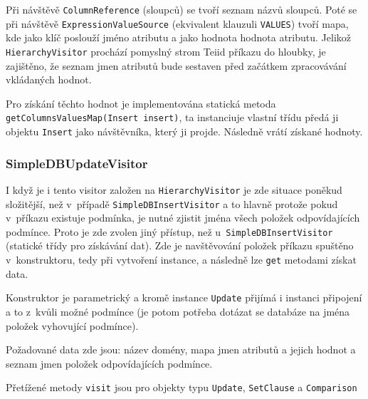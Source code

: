\documentclass[oneside,12pt]{fithesis2}
\begin{document}
Při návštěvě \texttt{ColumnReference} (sloupců) se tvoří seznam názvů sloupců. Poté se při návštěvě \texttt{ExpressionValueSource} (ekvivalent klauzuli \texttt{VALUES}) tvoří mapa, kde jako klíč poslouží jméno atributu a jako hodnota hodnota atributu. Jelikož \texttt{HierarchyVisitor} prochází pomyslný strom Teiid příkazu do hloubky, je zajištěno, že seznam jmen atributů bude sestaven před začátkem zpracovávání vkládaných hodnot.

Pro získání těchto hodnot je implementována statická metoda \texttt{get\allowbreak Columns\allowbreak ValuesMap(Insert insert)}, ta instanciuje vlastní třídu předá ji objektu \texttt{Insert} jako návštěvníka, který ji projde. Následně vrátí získané hodnoty.

\subsubsection*{SimpleDBUpdateVisitor}
I když je i tento visitor založen na \texttt{HierarchyVisitor} je zde situace poněkud složitější, než v~případě \texttt{SimpleDBInsertVisitor} a to hlavně protože pokud v~příkazu existuje podmínka, je nutné zjistit jména všech položek odpovídajících podmínce. Proto je zde zvolen jiný přístup, než u~\texttt{SimpleDBInsertVisitor} (statické třídy pro získávání dat). Zde je navštěvování položek příkazu spuštěno v~konstruktoru, tedy při vytvoření instance, a následně lze \texttt{get} metodami získat  data.

Konstruktor je parametrický a kromě instance \texttt{Update} přijímá i instanci připojení a to z~kvůli možné podmínce (je potom potřeba dotázat se databáze na jména položek vyhovující podmínce).

Požadované data zde jsou: název domény, mapa jmen atributů a jejich hodnot a seznam jmen položek odpovídajících podmínce.

Přetížené metody \texttt{visit} jsou pro objekty typu \texttt{Update}, \texttt{SetClause} a \texttt{Comparison}
\end{document}
